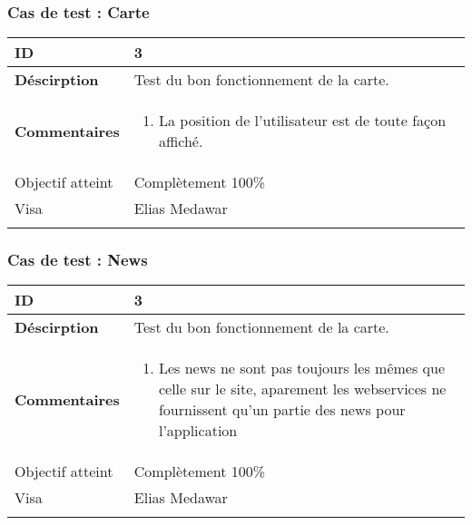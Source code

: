 		 		 \subsubsection*{Cas de test : Carte}
		 		 		 \begin{longtable}{m{4cm}|p{10cm}|}
		 		 		 \textbf{ ID} & 3 \\
		 		 		 \hline \textbf{Déscirption} &  Test du bon fonctionnement de la carte.\\
		 		 		 \hline \textbf{Commentaires} &  
		 		 		 	 	 \begin{enumerate}
	 		 		 		 	 		\item La position de l'utilisateur est de toute façon affiché.
	 		 		 		 	\end{enumerate} \\
	 		 		 		  				\hline Objectif atteint & {\color{green} Complètement  100\% \XBox } \\
	 		 		 		  				\hline Visa & Elias Medawar 	\\
		 		 		 \\
		 		 \end{longtable} 
		 		 \subsubsection*{Cas de test : News}
		 		 		 		 		 \begin{longtable}{m{4cm}|p{10cm}|}
		 		 		 		 		 \textbf{ ID} & 3 \\
		 		 		 		 		 \hline \textbf{Déscirption} &  Test du bon fonctionnement de la carte.\\
		 		 		 		 		 \hline \textbf{Commentaires} &  
		 		 		 		 		 	 	 \begin{enumerate}
		 		 	 		 		 		 	 		\item Les news ne sont pas toujours les mêmes que celle sur le site, aparement les webservices ne fournissent qu'un partie des news pour l'application
		 		 	 		 					 	\end{enumerate} \\
		 		 	 		 		 		  				\hline Objectif atteint & {\color{green} Complètement 100\% \XBox } \\
		 		 	 		 		 		  				\hline Visa & Elias Medawar 	\\
		 		 		 		 		 \\
		 		 		 		 \end{longtable} 
